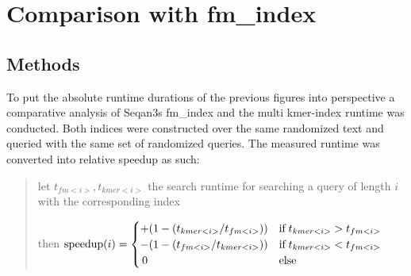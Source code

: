 \section{Comparison with fm\_index}
\subsection{Methods}
To put the absolute runtime durations of the previous figures into perspective a comparative analysis
of Seqan3s fm\_index and the multi kmer-index runtime was conducted. Both indices were
constructed over the same randomized text and queried with the same set of randomized queries. \newpage
The measured runtime was converted into relative speedup as such:

\begin{verse}
let $t_{fm<i>},t_{kmer<i>}$ the search runtime for searching a query
of length $i$ with the corresponding index

then $\text{{speedup}}(i)=
\begin{cases}
+(1-(t_{kmer<i>}/t_{fm<i>})) & \text{{if}\;}t_{kmer<i>}>t_{fm<i>}\\
-(1-(t_{fm<i>}/t_{kmer<i>})) & \text{{if}\;}t_{kmer<i>}<t_{fm<i>}\\
\,0 & \text{{else}}
\end{cases}$
\end{verse}

